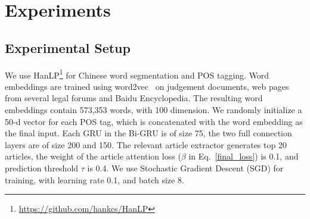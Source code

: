 \section{Experiments}
\subsection{Experimental Setup}
We use HanLP\footnote{\url{https://github.com/hankcs/HanLP}} for Chinese word segmentation and POS tagging.
Word embeddings are trained using word2vec~\cite{mikolov2013distributed} on judgement documents, web pages from several legal forums and Baidu Encyclopedia. The resulting word embeddings contain 573,353 words, with 100 dimension.
We randomly initialize a 50-d vector for each POS tag, which is concatenated with the word embedding as the final input.
Each GRU in the Bi-GRU is of size 75, the two full connection layers are of size 200 and 150.
The relevant article extractor generates top 20 articles, the weight of the article attention loss ($\beta$ in Eq.~\ref{final_loss}) is 0.1, and prediction threshold $\tau$ is 0.4.
We use Stochastic Gradient Descent (SGD) for training, with learning rate 0.1, and batch size 8.

